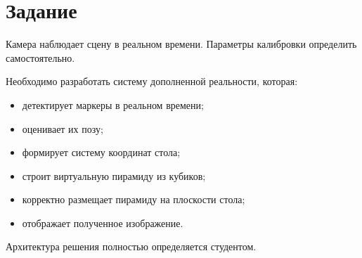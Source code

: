 \documentclass[a4paper,12pt]{article}
\begin{document}
\section*{Задание}

Камера наблюдает сцену в реальном времени. Параметры калибровки определить самостоятельно.

Необходимо разработать систему дополненной реальности, которая:

\begin{itemize}
    \item детектирует маркеры в реальном времени;
    \item оценивает их позу;
    \item формирует систему координат стола;
    \item строит виртуальную пирамиду из кубиков;
    \item корректно размещает пирамиду на плоскости стола;
    \item отображает полученное изображение.
\end{itemize}

Архитектура решения полностью определяется студентом.
\end{document}
